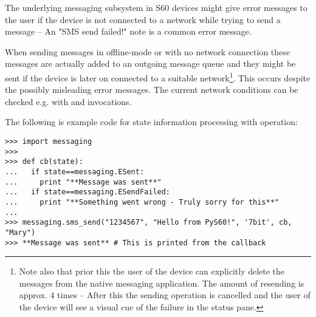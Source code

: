 The underlying messaging subsystem in S60 devices might give error messages to 
the user if the device is not connected to a network while trying to send a 
message -- An "SMS send failed!" note is a common error message.

When sending messages in offline-mode or with no network connection these 
messages are actually added to an outgoing message queue and they might be sent 
if the device is later on connected to a suitable network\footnote{Note also 
that prior this the user of the device can explicitly delete the messages from 
the native messaging application. The amount of resending is approx. 4 times --
After this the sending operation is cancelled and the user of the device will 
see a visual cue of the failure in the status pane.}. This occurs despite the 
possibly misleading error messages. The current network conditions can be 
checked e.g. with  and 
 invocations.

The following is example code for state information processing with 
 operation:

\begin{verbatim}
>>> import messaging
>>>
>>> def cb(state):
...   if state==messaging.ESent:
...     print "**Message was sent**"
...   if state==messaging.ESendFailed:
...     print "**Something went wrong - Truly sorry for this**"
...
>>> messaging.sms_send("1234567", "Hello from PyS60!", '7bit', cb, "Mary")
>>> **Message was sent** # This is printed from the callback
\end{verbatim}
